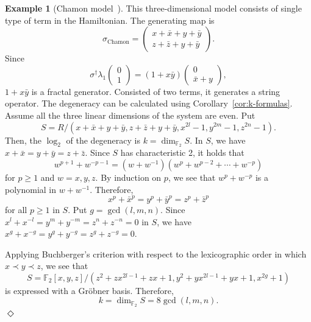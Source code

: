 \documentclass[letterpaper,12pt]{amsart}
\theoremstyle{definition} \newtheorem{defn}{Definition}
\theoremstyle{definition} \newtheorem{rem}{Remark}
\theoremstyle{definition} \newtheorem{example}{Example}
\newcommand{\FF}{\mathbb{F}}
\begin{document}
\begin{example}[Chamon model~\cite{Chamon2005Quantum,BravyiLeemhuisTerhal2011Topological}]
This three-dimensional model consists of single type of term in the Hamiltonian.
The generating map is
\[
\sigma_\text{Chamon} =
\begin{pmatrix}
 x+\bar x + y + \bar y \\
\hline
 z+\bar z + y + \bar y
\end{pmatrix}.
\]
Since
\[
 \sigma^\dagger \lambda_1
\begin{pmatrix}
0 \\ 
1
\end{pmatrix}
=
(1+ x \bar y)
\begin{pmatrix}
 0 \\
\bar x + y
\end{pmatrix},
\]
$1+x \bar y$ is a fractal generator.
Consisted of two terms, it generates a string operator.
The degeneracy can be calculated using Corollary~\ref{cor:k-formulas}.
Assume all the three linear dimensions of the system are even.
Put
\[
 S = R / (x + \bar x + y + \bar y, z + \bar z + y + \bar y, x^{2l} -1, y^{2m}-1, z^{2n} -1 ).
\]
Then, the $\log_2$ of the degeneracy is $k = \dim_{\FF_2} S$.
In $S$, we have $x + \bar x = y + \bar y = z + \bar z$.
Since $S$ has characteristic 2, it holds that
\[
 w^{p+1} + w^{-p-1} = (w + w^{-1})(w^p + w^{p-2} + \cdots + w^{-p})
\]
for $p \ge 1$ and $w = x,y,z$. By induction on $p$, we see that $w^{p} + w^{-p}$
is a polynomial in $w + w^{-1}$. Therefore,
\[
 x^p + \bar x ^p = y^p + \bar y^p = z^p + \bar z^p
\]
for all $p \ge 1$ in $S$.
Put $g = \gcd(l,m,n)$.
Since $x^l + x^{-l} = y^m + y^{-m} = z^n + z^{-n} = 0$ in $S$,
we have $x^g + x^{-g} = y^g + y^{-g} = z^g + z^{-g} = 0$.

Applying Buchberger's criterion with respect to the lexicographic order in which $x \prec y \prec z$,
we see that
\[
 S = \FF_2[x,y,z] / (z^2 + zx^{2l-1}+ zx+1, y^2 + yx^{2l-1}+yx+1, x^{2g}+1)
\]
is expressed with a Gr\"obner basis. Therefore,
\[
 k = \dim_{\FF_2} S = 8 \gcd(l,m,n).
\]
\hfill $\Diamond$
\end{example}
\end{document}
